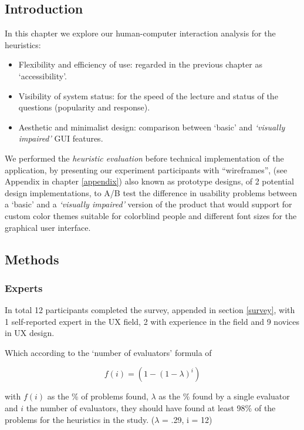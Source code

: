 \documentclass{article}
\begin{document}

\subsection{Introduction\label{introduction}}

In this chapter we explore our human-computer interaction analysis for the \textcite{Nielsen1994} heuristics:

\begin{itemize}
    \item Flexibility and efficiency of use: regarded in the previous chapter as `accessibility'.
    \item Visibility of system status: for the speed of the lecture and status of the questions (popularity and response).
    \item Aesthetic and minimalist design: comparison between `basic' and \emph{`visually impaired'} GUI features.
\end{itemize}

We performed the \emph{heuristic evaluation} before technical implementation of the application, by presenting our experiment participants with ``wireframes'',
(see Appendix in chapter \ref{appendix}) also known as prototype designs, of 2 potential design implementations, to A/B test the difference in
usability problems between a `basic' and a \emph{`visually impaired'} version of the product that would support for custom
color themes suitable for colorblind people and different font sizes for the graphical user interface.

\subsection{Methods\label{methods}}

\subsubsection{Experts\label{experts}}

In total 12 participants completed the survey, appended in section \ref{survey}, with 1 self-reported expert in the UX field,
2 with experience in the field and 9 novices in UX design.

Which according to the `number of evaluators' formula of \textcite{Nielsen1994}

$$f(i) = (1-(1-\lambda)^i)$$

with $f(i)$ as the \% of problems found, $\lambda$ as the \% found by a single evaluator and $i$ the number of evaluators, 
they should have found at least 98\% of the problems for the heuristics in the study. ($\lambda$ = .29, i = 12)
\end{document}
